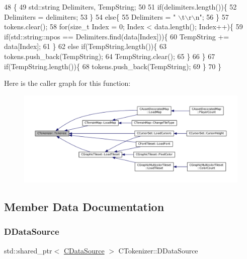 \begin{DoxyCode}
48                                                                                                           \{
49     std::string Delimiters, TempString;
50     
51     \textcolor{keywordflow}{if}(delimiters.length())\{
52         Delimiters = delimiters;
53     \}
54     \textcolor{keywordflow}{else}\{
55         Delimiters = \textcolor{stringliteral}{" \(\backslash\)t\(\backslash\)r\(\backslash\)n"};
56     \}
57     tokens.clear();
58     \textcolor{keywordflow}{for}(\textcolor{keywordtype}{size\_t} Index = 0; Index < data.length(); Index++)\{
59         \textcolor{keywordflow}{if}(std::string::npos == Delimiters.find(data[Index]))\{
60             TempString += data[Index];
61         \}
62         \textcolor{keywordflow}{else} \textcolor{keywordflow}{if}(TempString.length())\{
63             tokens.push\_back(TempString);
64             TempString.clear();
65         \}
66     \}
67     \textcolor{keywordflow}{if}(TempString.length())\{
68         tokens.push\_back(TempString);
69     \}
70 \}
\end{DoxyCode}
Here is the caller graph for this function\+:\nopagebreak
\begin{figure}[H]
\begin{center}
\leavevmode
\includegraphics[width=350pt]{classCTokenizer_a7477f6849a3d0a5154879d8622e4012c_icgraph}
\end{center}
\end{figure}


\subsection{Member Data Documentation}
\hypertarget{classCTokenizer_aaa6faab432000d3f942a0c14fc09f60b}{}\label{classCTokenizer_aaa6faab432000d3f942a0c14fc09f60b} 
\subsubsection{\texorpdfstring{D\+Data\+Source}{DDataSource}}
{\footnotesize\ttfamily std\+::shared\+\_\+ptr$<$ \hyperlink{classCDataSource}{C\+Data\+Source} $>$ C\+Tokenizer\+::\+D\+Data\+Source\hspace{0.3cm}{\ttfamily [protected]}}



